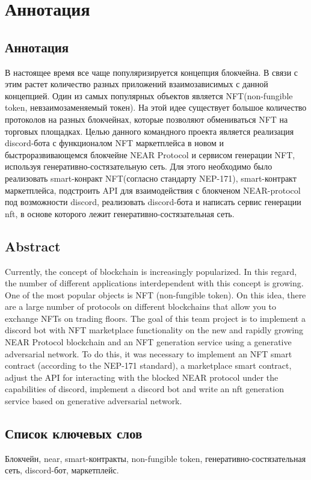 \section{Аннотация}

\subsection{Аннотация}

В настоящее время все чаще популяризируется концепция блокчейна. В связи с этим растет количество разных приложений взаимозависимых с данной концепцией. Один из самых популярных объектов является NFT(non-fungible token, невзаимозаменяемый токен). На этой идее существует большое количество протоколов на разных блокчейнах, которые позволяют обмениваться NFT на торговых площадках. Целью данного командного проекта является реализация discord-бота с функционалом NFT маркетплейса в новом и быстроразвивающемся блокчейне NEAR Protocol и сервисом генерации NFT, используя генеративно-состязательную сеть. Для этого необходимо было реализовать smart-конракт NFT(согласно стандарту NEP-171), smart-контракт маркетплейса, подстроить API для взаимодействия с блокченом NEAR-protocol под возможности discord, реализовать discord-бота и написать сервис генерации nft, в основе которого лежит генеративно-состязательная сеть.

\subsection{Abstract}
Currently, the concept of blockchain is increasingly popularized. In this regard, the number of different applications interdependent with this concept is growing. One of the most popular objects is NFT (non-fungible token). On this idea, there are a large number of protocols on different blockchains that allow you to exchange NFTs on trading floors. The goal of this team project is to implement a discord bot with NFT marketplace functionality on the new and rapidly growing NEAR Protocol blockchain and an NFT generation service using a generative adversarial network. To do this, it was necessary to implement an NFT smart contract (according to the NEP-171 standard), a marketplace smart contract, adjust the API for interacting with the blocked NEAR protocol under the capabilities of discord, implement a discord bot and write an nft generation service based on generative adversarial network.

\subsection{Список ключевых слов}
Блокчейн, near, smart-контракты, non-fungible token, генеративно-состязательная сеть, discord-бот, маркетплейс.

\newpage

